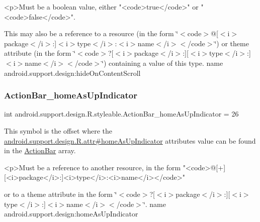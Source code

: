 \begin{DoxyVerb}      <p>Must be a boolean value, either "<code>true</code>" or "<code>false</code>".
\end{DoxyVerb}
 

This may also be a reference to a resource (in the form \char`\"{}$<$code$>$@\mbox{[}$<$i$>$package$<$/i$>$\+:\mbox{]}$<$i$>$type$<$/i$>$\+:$<$i$>$name$<$/i$>$$<$/code$>$\char`\"{}) or theme attribute (in the form \char`\"{}$<$code$>$?\mbox{[}$<$i$>$package$<$/i$>$\+:\mbox{]}\mbox{[}$<$i$>$type$<$/i$>$\+:\mbox{]}$<$i$>$name$<$/i$>$$<$/code$>$\char`\"{}) containing a value of this type.  name android.\+support.\+design\+:hide\+On\+Content\+Scroll \mbox{\label{classandroid_1_1support_1_1design_1_1R_1_1styleable_a99993170cd30fcfabe0a4cf22e1ab405}} 
\subsubsection{\texorpdfstring{Action\+Bar\+\_\+home\+As\+Up\+Indicator}{ActionBar\_homeAsUpIndicator}}
{\footnotesize\ttfamily int android.\+support.\+design.\+R.\+styleable.\+Action\+Bar\+\_\+home\+As\+Up\+Indicator = 26\hspace{0.3cm}{\ttfamily [static]}}

This symbol is the offset where the \hyperlink{classandroid_1_1support_1_1design_1_1R_1_1attr_acd12fadab5fd0cefc308b364fc46c135}{android.\+support.\+design.\+R.\+attr\#home\+As\+Up\+Indicator} attribute\textquotesingle{}s value can be found in the \hyperlink{classandroid_1_1support_1_1design_1_1R_1_1styleable_ab795220a96557d11f8c21359b95bed82}{Action\+Bar} array.

\begin{DoxyVerb}      <p>Must be a reference to another resource, in the form "<code>@[+][<i>package</i>:]<i>type</i>:<i>name</i></code>"
\end{DoxyVerb}
 or to a theme attribute in the form \char`\"{}$<$code$>$?\mbox{[}$<$i$>$package$<$/i$>$\+:\mbox{]}\mbox{[}$<$i$>$type$<$/i$>$\+:\mbox{]}$<$i$>$name$<$/i$>$$<$/code$>$\char`\"{}.  name android.\+support.\+design\+:home\+As\+Up\+Indicator \mbox{\label{classandroid_1_1support_1_1design_1_1R_1_1styleable_a68a6be872a400b3a54e7392b5af0942c}} 
